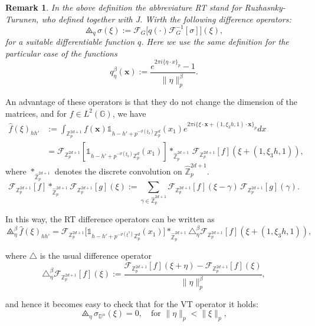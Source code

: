 \documentclass[12pt, reqno]{amsart}
\newtheorem{rem}[defi]{Remark}
\newcommand{\1}{\mathds{1}}
\begin{document}
\begin{rem}
    In the above definition the abbreviature RT stand for Ruzhasnky-Turunen, who defined together with J. Wirth the following difference operators: $$\triangletimes_q \sigma (\xi) := \mathcal{F}_G \Big[ q (\cdot) \mathcal{F}_G^{-1}[\sigma] \Big](\xi) ,$$for a suitable differentiable function $q$. Here we use the same definition for the particular case of the functions $$q_\eta^\beta (\mathbf{x}) := \frac{e^{2 \pi i \{\eta \cdot x\}_p} - 1}{ \| \eta \|_p^\beta}.$$
\end{rem}



An advantage of these operators is that they do not change the dimension of the matrices, and for $f \in L^2(\mathbb{G})$, we have
\begin{align*}
    \hat{f}(\xi)_{hh'} &:= \int_{\mathbb{Z}_p^{2d+1}} f(\mathbf{x}) \mathbb{1}_{h-h'+p^{-\vartheta(\xi_3)} \mathbb{Z}_p^d}(x_1) e^{2 \pi i \{ \xi \cdot \mathbf{x} + (1, \xi_3 h, 1) \cdot \mathbf{x} \}_p} dx \\&= \mathcal{F}_{\mathbb{Z}_p^{2d+1}}[\mathbb{1}_{h-h'+p^{-\vartheta(\xi_3)} \mathbb{Z}_p^d}(x_1)] \ast_{\widehat{\mathbb{Z}}_p^{2d+1}}  \, \mathcal{F}_{\mathbb{Z}_p^{2d+1}}[f](\xi + (1, \xi_3 h,1)),
\end{align*}
where $\ast_{\widehat{\mathbb{Z}}_p^{2d+1}} $ denotes the discrete convolution on $\widehat{\mathbb{Z}}_p^{2d+1}$.
\[
\mathcal{F}_{\mathbb{Z}_p^{2d+1}}[f] \ast_{\hat{\mathbb{Z}}_p^{2d+1}} \mathcal{F}_{\mathbb{Z}_p^{2d+1}}[g](\xi) := \sum_{\gamma \in \hat{\mathbb{Z}}_p^{2d+1}} \mathcal{F}_{\mathbb{Z}_p^{2d+1}}[f](\xi - \gamma)\, \mathcal{F}_{\mathbb{Z}_p^{2d+1}}[g](\gamma).
\]

In this way, the RT difference operators can be written as
\[
\triangletimes^\beta_{\eta} \widehat{f}(\xi)_{hh'} = \mathcal{F}_{\mathbb{Z}_p^{2d+1}}\Big[\mathbb{1}_{h-h' + p^{-\vartheta(\xi^3)}\mathbb{Z}_p^d}(x_1)\Big] \ast_{\hat{\mathbb{Z}}_p^{2d+1}} \triangle^\beta_{\eta} \mathcal{F}_{\mathbb{Z}_p^{2d+1}}[f](\xi + (1, \xi_3 h, 1)),
\]

where $\triangle$ is the usual difference operator
\[
\triangle^\beta_{\eta} \mathcal{F}_{\mathbb{Z}_p^{2d+1}}[f](\xi) := \frac{\mathcal{F}_{\mathbb{Z}_p^{2d+1}}[f](\xi + \eta) - \mathcal{F}_{\mathbb{Z}_p^{2d+1}}[f](\xi)}{\|\eta\|_p^\beta},
\]

and hence it becomes easy to check that for the VT operator it holds:
\[
\triangletimes_{\eta} \sigma_{\mathbb{D}^\alpha}(\xi) = 0, \quad \text{for } \|\eta\|_p < \|\xi\|_p,
\]
\end{document}

